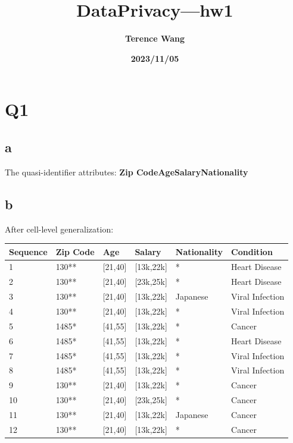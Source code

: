 \documentclass[12pt]{article}
\title{\textbf{DataPrivacy—hw1}}
\author{\textbf{Terence Wang}}%
\date{\textbf{2023/11/05}}%
\begin{document}
\maketitle
\tableofcontents
\newpage

\section{Q1}
\subsection{a}
The quasi-identifier attributes: \textbf{Zip Code}\quad \textbf{Age}\quad \textbf{Salary}\quad \textbf{Nationality}
\subsection{b}
After cell-level generalization:
\newline
\begin{tabular}{|l|l|l|l|l|l|}
    \hline
    Sequence & Zip Code & Age     & Salary    & Nationality & Condition       \\
    \hline
    1        & 130**    & [21,40] & [13k,22k] & *           & Heart Disease   \\
    \hline
    2        & 130**    & [21,40] & [23k,25k] & *           & Heart Disease   \\
    \hline
    3        & 130**    & [21,40] & [13k,22k] & Japanese    & Viral Infection \\
    \hline
    4        & 130**    & [21,40] & [13k,22k] & *           & Viral Infection \\
    \hline
    5        & 1485*    & [41,55] & [13k,22k] & *           & Cancer          \\
    \hline
    6        & 1485*    & [41,55] & [13k,22k] & *           & Heart Disease   \\
    \hline
    7        & 1485*    & [41,55] & [13k,22k] & *           & Viral Infection \\
    \hline
    8        & 1485*    & [41,55] & [13k,22k] & *           & Viral Infection \\
    \hline
    9        & 130**    & [21,40] & [13k,22k] & *           & Cancer          \\
    \hline
    10       & 130**    & [21,40] & [23k,25k] & *           & Cancer          \\
    \hline
    11       & 130**    & [21,40] & [13k,22k] & Japanese    & Cancer          \\
    \hline
    12       & 130**    & [21,40] & [13k,22k] & *           & Cancer          \\
    \hline
\end{tabular}
\end{document}
